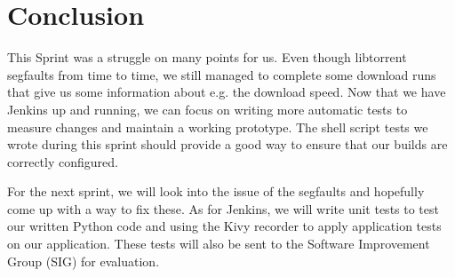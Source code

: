 	\section{Conclusion}
		This Sprint was a struggle on many points for us. Even though libtorrent segfaults from time to time, we still managed to complete some download runs that give us some information about e.g. the download speed. Now that we have Jenkins up and running, we can focus on writing more automatic tests to measure changes and maintain a working prototype. The shell script tests we wrote during this sprint should provide a good way to ensure that our builds are correctly configured.
		
		For the next sprint, we will look into the issue of the segfaults and hopefully come up with a way to fix these. As for Jenkins, we will write unit tests to test our written Python code and using the Kivy recorder to apply application tests on our application. These tests will also be sent to the Software Improvement Group (SIG) for evaluation.
